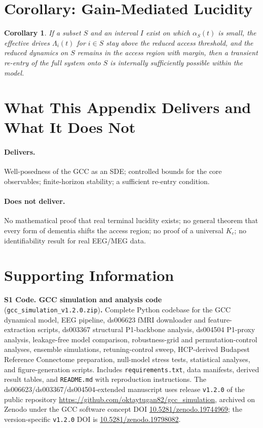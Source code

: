 \documentclass[11pt,a4paper]{article}
\theoremstyle{plain}
\newtheorem{corollary}[theorem]{Corollary}
\theoremstyle{definition}
\theoremstyle{remark}
\begin{document}
\section{Corollary: Gain-Mediated Lucidity}

\begin{corollary}
\label{kor:lucidity}
If a subset $S$ and an interval $I$ exist on which $\alpha_S(t)$ is small, the effective drives $\Lambda_i(t)$ for $i \in S$ stay above the reduced access threshold, and the reduced dynamics on $S$ remains in the access region with margin, then a transient re-entry of the full system onto $S$ is internally sufficiently possible within the model.
\end{corollary}

\section{What This Appendix Delivers and What It Does Not}

\paragraph{Delivers.}
Well-posedness of the GCC as an SDE; controlled bounds for the core observables; finite-horizon stability; a sufficient re-entry condition.

\paragraph{Does not deliver.}
No mathematical proof that real terminal lucidity exists; no general theorem that every form of dementia shifts the access region; no proof of a universal $K_c$; no identifiability result for real EEG/MEG data.


\section*{Supporting Information}

\noindent\textbf{S1 Code. GCC simulation and analysis code} (\texttt{gcc\_simulation\_v1.2.0.zip})\textbf{.} Complete Python codebase for the GCC dynamical model, EEG pipeline, ds006623 fMRI downloader and feature-extraction scripts, ds003367 structural P1-backbone analysis, ds004504 P1-proxy analysis, leakage-free model comparison, robustness-grid and permutation-control analyses, ensemble simulations, retuning-control sweep, HCP-derived Budapest Reference Connectome preparation, null-model stress tests, statistical analyses, and figure-generation scripts. Includes \texttt{requirements.txt}, data manifests, derived result tables, and \texttt{README.md} with reproduction instructions. The ds006623/ds003367/ds004504-extended manuscript uses release \texttt{v1.2.0} of the public repository \url{https://github.com/oktaytugan82/gcc_simulation}, archived on Zenodo under the GCC software concept DOI \href{https://doi.org/10.5281/zenodo.19744969}{10.5281/zenodo.19744969}; the version-specific \texttt{v1.2.0} DOI is \href{https://doi.org/10.5281/zenodo.19798082}{10.5281/zenodo.19798082}.
\end{document}
